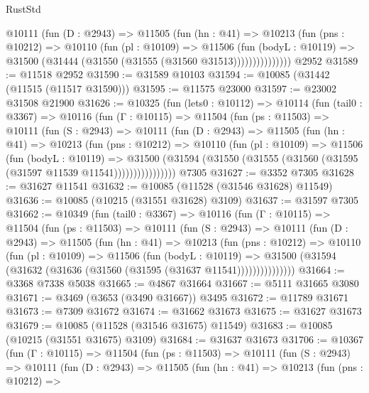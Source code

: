 \begin{lexlean}{RustStd}
\begin{coremodule}
              @10111
                (fun (D : @2943) =>
                @11505
                  (fun (hn : @41) =>
                  @10213
                    (fun (pns : @10212) =>
                    @10110
                      (fun (pl : @10109) =>
                      @11506
                        (fun (bodyL : @10119) =>
                        @31500 (@31444 (@31550 (@31555 (@31560 @31513)))))))))))))))
    @2952
@31589 := @11518 @2952
@31590 := @31589 @10103
@31594 := @10085 (@31442 (@11515 (@11517 @31590)))
@31595 := @11575 @23000
@31597 := @23002 @31508 @21900
@31626 := @10325
    (fun (lets0 : @10112) =>
    @10114
      (fun (tail0 : @3367) =>
      @10116
        (fun (Γ : @10115) =>
        @11504
          (fun (ps : @11503) =>
          @10111
            (fun (S : @2943) =>
            @10111
              (fun (D : @2943) =>
              @11505
                (fun (hn : @41) =>
                @10213
                  (fun (pns : @10212) =>
                  @10110
                    (fun (pl : @10109) =>
                    @11506
                      (fun (bodyL : @10119) =>
                      @31500
                        (@31594
                          (@31550 (@31555 (@31560 (@31595 (@31597 @11539 @11541))))))))))))))))
    @7305
@31627 := @3352 @7305
@31628 := @31627 @11541
@31632 := @10085 (@11528 (@31546 @31628) @11549)
@31636 := @10085 (@10215 (@31551 @31628) @3109)
@31637 := @31597 @7305
@31662 := @10349
    (fun (tail0 : @3367) =>
    @10116
      (fun (Γ : @10115) =>
      @11504
        (fun (ps : @11503) =>
        @10111
          (fun (S : @2943) =>
          @10111
            (fun (D : @2943) =>
            @11505
              (fun (hn : @41) =>
              @10213
                (fun (pns : @10212) =>
                @10110
                  (fun (pl : @10109) =>
                  @11506
                    (fun (bodyL : @10119) =>
                    @31500 (@31594 (@31632 (@31636 (@31560 (@31595 (@31637 @11541)))))))))))))))
@31664 := @3368 @7338 @5038
@31665 := @4867 @31664
@31667 := @5111 @31665 @3080
@31671 := @3469 (@3653 (@3490 @31667)) @3495
@31672 := @11789 @31671
@31673 := @7309 @31672
@31674 := @31662 @31673
@31675 := @31627 @31673
@31679 := @10085 (@11528 (@31546 @31675) @11549)
@31683 := @10085 (@10215 (@31551 @31675) @3109)
@31684 := @31637 @31673
@31706 := @10367
    (fun (Γ : @10115) =>
    @11504
      (fun (ps : @11503) =>
      @10111
        (fun (S : @2943) =>
        @10111
          (fun (D : @2943) =>
          @11505
            (fun (hn : @41) =>
            @10213
              (fun (pns : @10212) =>

\end{coremodule}
\end{lexlean}
